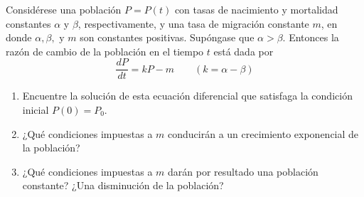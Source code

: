 \item Considérese una población $P = P(t)$ con tasas de nacimiento y mortalidad constantes $\alpha$ y $\beta$, respectivamente, y una tasa de migración constante $m$, en donde $\alpha, \beta, \text{ y } m$ son constantes positivas. Supóngase que $\alpha > \beta$. Entonces la razón de cambio de la población en el tiempo $t$ está dada por
    \[ \frac{dP}{dt} = kP - m \qquad (k = \alpha - \beta) \]
    \begin{enumerate}
        \item[(a)] Encuentre la solución de esta ecuación diferencial que satisfaga la condición inicial $P(0) = P_0$.
        \item[(b)] ¿Qué condiciones impuestas a $m$ conducirán a un crecimiento exponencial de la población?
        \item[(c)] ¿Qué condiciones impuestas a $m$ darán por resultado una población constante? ¿Una disminución de la población?
    \end{enumerate}
